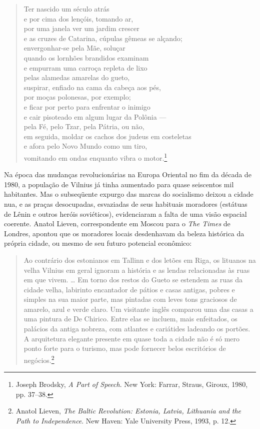 %
\begin{verse}
Ter nascido um século atrás\\
e por cima dos lençóis, tomando ar,\\
por uma janela ver um jardim crescer\\
e as cruzes de Catarina, cúpulas gêmeas se alçando;\\
envergonhar-se pela Mãe, soluçar\\
quando os lornhões brandidos examinam\\
e empurram uma carroça repleta de lixo\\
pelas alamedas amarelas do gueto,\\
suspirar, enfiado na cama da cabeça aos pés,\\
por moças polonesas, por exemplo;\\
e ficar por perto para enfrentar o inimigo\\
e cair pisoteado em algum lugar da Polônia ---\\
pela Fé, pelo Tzar, pela Pátria, ou não,\\
em seguida, moldar os cachos dos judeus em \qb{}costeletas\\
e afora pelo Novo Mundo como um tiro,\\
vomitando em ondas enquanto vibra o motor.\footnote{Joseph Brodsky, \emph{A
  Part of Speech}. New York: Farrar, Straus, Giroux, 1980, pp. 37--38.}

\end{verse}

Na época das mudanças revolucionárias na Europa Oriental no fim da
década de 1980, a população de Vilnius já tinha aumentado para quase
seiscentos mil habitantes. Mas o subseqüente expurgo das marcas do
socialismo deixou a cidade nua, e as praças desocupadas, esvaziadas de
seus habituais moradores (estátuas de Lênin e outros heróis
soviéticos), evidenciaram a falta de uma visão espacial coerente. Anatol
Lieven, correspondente em Moscou para o \emph{The Times} de Londres,
apontou que os moradores locais desdenhavam da beleza histórica da
própria cidade, ou mesmo de seu futuro potencial econômico:

\begin{quote}
Ao contrário dos estonianos em Tallinn e dos letões em Riga, os lituanos
na velha Vilnius em geral ignoram a história e as lendas relacionadas às
ruas em que vivem. \ldots{} Em torno dos restos do Gueto se estendem as
ruas da cidade velha, labirinto encantador de pátios e casas antigas,
pobres e simples na sua maior parte, mas pintadas com leves tons
graciosos de amarelo, azul e verde claro. Um visitante inglês comparou
uma das casas a uma pintura de De Chirico. Entre elas se incluem, mais
enfeitados, os palácios da antiga nobreza, com atlantes e cariátides
ladeando os portões. A arquitetura elegante presente em quase toda a
cidade não é só mero ponto forte para o turismo, mas pode fornecer belos
escritórios de negócios.\footnote{Anatol Lieven, \emph{The Baltic
  Revolution: Estonia, Latvia, Lithuania and the Path to Independence}.
  New Haven: Yale University Press, 1993, p. 12.}
\end{quote}

